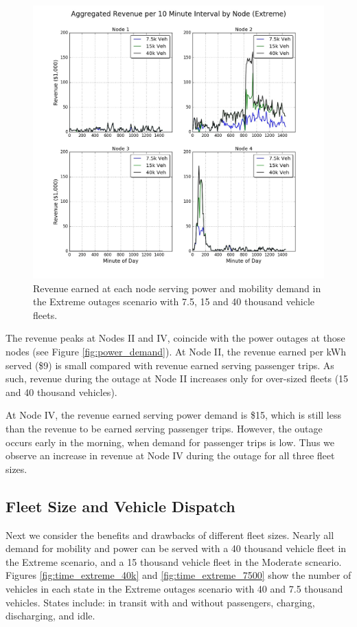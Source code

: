 \documentclass[journal]{IEEEtran}
\begin{document}
\begin{figure}[!htbp]
  \includegraphics[width=\linewidth]{plots/aggregated-revenue-by-node.jpg}
  \caption{Revenue earned at each node serving power and mobility demand in the Extreme outages scenario with 7.5, 15 and 40 thousand vehicle fleets.}
  \label{fig:node_revenue}
\end{figure}

The revenue peaks at Nodes II and IV, coincide with the power outages at those nodes (see Figure \ref{fig:power_demand}). At Node II, the revenue earned per kWh served (\$9) is small compared with revenue earned serving passenger trips. As such, revenue during the outage at Node II increases only for over-sized fleets (15 and 40 thousand vehicles). 

At Node IV, the revenue earned serving power demand is \$15, which is still less than the revenue to be earned serving passenger trips. However, the outage occurs early in the morning, when demand for passenger trips is low. Thus we observe an increase in revenue at Node IV during the outage for all three fleet sizes.

\subsection{Fleet Size and Vehicle Dispatch}
Next we consider the benefits and drawbacks of different fleet sizes. Nearly all demand for mobility and power can be served with a 40 thousand vehicle fleet in the Extreme scenario, and a 15 thousand vehicle fleet in the Moderate scneario. Figures \ref{fig:time_extreme_40k} and \ref{fig:time_extreme_7500} show the number of vehicles in each state in the Extreme outages scenario with 40 and 7.5 thousand vehicles. States include: in transit with and without passengers, charging, discharging, and idle. 
\end{document}
